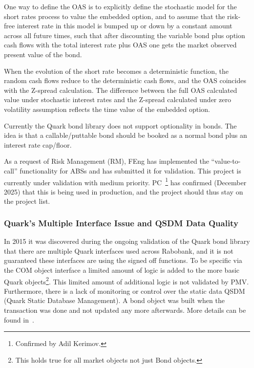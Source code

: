 \documentclass[reviewdoc]{pmv_report}  %
\begin{document}
One way to define the OAS is to explicitly define the stochastic model for the short rates process to value the embedded option, and to assume that the risk-free interest rate in this model is bumped up or down by a constant amount across all future times, such that after discounting the variable bond plus option cash flows with the total interest rate plus OAS one gets the market observed present value of the bond.

When the evolution of the short rate becomes a deterministic function, the random cash flows reduce to the deterministic cash flows, and the OAS coincides with the Z-spread
calculation.
The difference between the full OAS calculated value under stochastic interest rates and the Z-spread calculated under zero volatility assumption reflects the time value of the embedded option.

Currently the Quark bond library does not support optionality in bonds.
The idea is that a callable/puttable bond should be booked as a normal bond plus an interest rate cap/floor.

\vspace{0.5cm}
\noindent{}
\vspace{0.5cm}

As a request of Risk Management (RM), FEng has implemented the ``value-to-call'' functionality for ABSs and has submitted it for validation. This project is currently under validation with medium priority. PC~\footnote{Confirmed by Adil Kerimov.} has confirmed (December 2025) that this is being used in production, and the project should thus stay on the project list.

\subsubsection{Quark's Multiple Interface Issue and QSDM Data Quality}
In 2015 it was discovered during the ongoing validation of the Quark bond library that there are multiple Quark interfaces used across Rabobank, and it is not guaranteed these interfaces are using the signed off functions.
To be specific via the COM object interface a limited amount of logic is added to the more basic Quark objects\footnote{This holds true for all market objects not just Bond objects.}.
This limited amount of additional logic is not validated by PMV. Furthermore, there is a lack of monitoring or control over the static data QSDM (Quark Static Database Management).
A bond object was built when the transaction was done and not updated any more afterwards.
More details can be found in~\cite{MemoMultiInterfaceQuark}.
\end{document}
